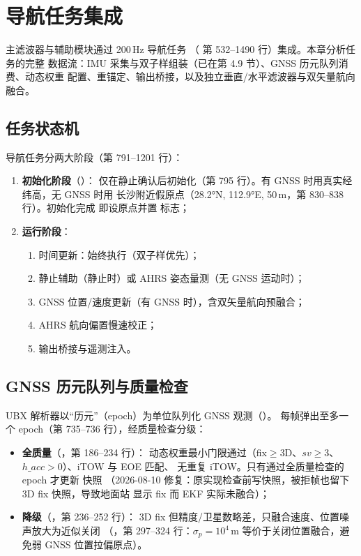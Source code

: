 \section{导航任务集成}

主滤波器与辅助模块通过 200\,Hz 导航任务 
（ 第 532--1490 行）集成。本章分析任务的完整
数据流：IMU 采集与双子样组装（已在第 4.9 节）、GNSS 历元队列消费、动态权重
配置、重锚定、输出桥接，以及独立垂直/水平滤波器与双矢量航向融合。

\subsection{任务状态机}

导航任务分两大阶段（第 791--1201 行）：
\begin{enumerate}
  \item \textbf{初始化阶段}（）：
    仅在静止确认后初始化（第 795 行）。有 GNSS 时用真实经纬高，无 GNSS 时用
    长沙附近假原点（28.2°N, 112.9°E, 50\,m，第 830--838 行）。初始化完成
    即设原点并置  标志；
  \item \textbf{运行阶段}：
    \begin{enumerate}
      \item 时间更新：始终执行（双子样优先）；
      \item 静止辅助（静止时）或 AHRS 姿态量测（无 GNSS 运动时）；
      \item GNSS 位置/速度更新（有 GNSS 时），含双矢量航向预融合；
      \item AHRS 航向偏置慢速校正；
      \item 输出桥接与遥测注入。
    \end{enumerate}
\end{enumerate}

\subsection{GNSS 历元队列与质量检查}

UBX 解析器以``历元''（epoch）为单位队列化 GNSS 观测（）。
每帧弹出至多一个 epoch（第 735--736 行），经质量检查分级：
\begin{itemize}
  \item \textbf{全质量}（，第 186--234 行）：
    动态权重最小门限通过（fix$\ge$3D、$sv\ge3$、$h\_acc>0$）、iTOW 与 EOE 匹配、
    无重复 iTOW。只有通过全质量检查的 epoch 才更新  快照
    （2026-08-10 修复：原实现检查前写快照，被拒帧也留下 3D fix 快照，导致地面站
    显示 fix 而 EKF 实际未融合）；
  \item \textbf{降级}（，第 236--252 行）：
    3D fix 但精度/卫星数略差，只融合速度、位置噪声放大为近似关闭
    （，第 297--324 行：$\sigma_p = 10^4$\,m
    等价于关闭位置融合，避免弱 GNSS 位置拉偏原点）。
\end{itemize}

